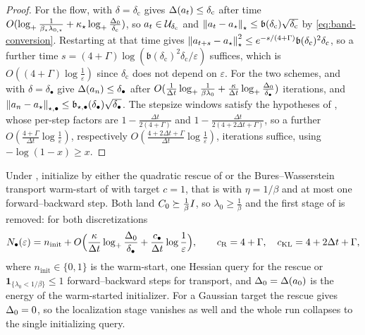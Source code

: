 \begin{proof}
For the flow,  with $\delta=\delta_{\mathrm c}$ gives
$\Delta(a_t)\leq\delta_{\mathrm c}$ after time
$O(\log_+\tfrac1{\beta_\star\lambda_{0,\star}}+\kappa_\star\log_+\tfrac{\Delta_0}{\delta_{\mathrm c}})$, so
$a_t\in\mathcal{U}_{\delta_{\mathrm c}}$ and
$\left\lVert a_t-a_\star\right\rVert_\star\leq\mathfrak b(\delta_{\mathrm c})\sqrt{\delta_{\mathrm c}}$ by
\eqref{eq:band-conversion}. Restarting  at that time gives
$\left\lVert a_{t+s}-a_\star\right\rVert_\star^2\leq e^{-s/(4+\Gamma)}\mathfrak b(\delta_{\mathrm c})^2\delta_{\mathrm c}$,
so a further time $s=(4+\Gamma)\log(\mathfrak b(\delta_{\mathrm c})^2\delta_{\mathrm c}/\varepsilon)$
suffices, which is $O((4+\Gamma)\log\tfrac1\varepsilon)$ since $\delta_{\mathrm c}$ does not
depend on $\varepsilon$. For the two schemes,  and  with
$\delta=\delta_\bullet$ give $\Delta(a_n)\leq\delta_\bullet$ after
$O(\tfrac1{\Delta t}\log_+\tfrac1{\beta\lambda_0}+\tfrac\kappa{\Delta t}\log_+\tfrac{\Delta_0}{\delta_\bullet})$
iterations, and $\left\lVert a_n-a_\star\right\rVert_{\star,\bullet}\leq\mathfrak b_{\star,\bullet}(\delta_\bullet)\sqrt{\delta_\bullet}$.
The stepsize windows satisfy the hypotheses of , whose per-step factors are
$1-\tfrac{\Delta t}{2(4+\Gamma)}$ and $1-\tfrac{\Delta t}{2(4+2\Delta t+\Gamma)}$, so a further
$O(\tfrac{4+\Gamma}{\Delta t}\log\tfrac1\varepsilon)$, respectively
$O(\tfrac{4+2\Delta t+\Gamma}{\Delta t}\log\tfrac1\varepsilon)$, iterations suffice, using
$-\log(1-x)\geq x$.
\end{proof}

\begin{corollary}
\label{cor:three-stage-burninfree}
Under , initialize by either the quadratic rescue of
 or the Bures--Wasserstein transport warm-start of  with
target $c=1$, that is with $\eta=1/\beta$ and at most one forward--backward step. Both land
$C_0\succeq\tfrac1\beta I$, so $\lambda_0\geq\tfrac1\beta$ and the first stage of
 is removed: for both discretizations
\[
    N_\bullet(\varepsilon)
    =n_{\mathrm{init}}
    +O\Bigl(\frac\kappa{\Delta t}\log_+\frac{\Delta_0}{\delta_\bullet}
    +\frac{c_\bullet}{\Delta t}\log\frac1\varepsilon\Bigr),
    \qquad
    c_{\mathrm{R}}=4+\Gamma,
    \quad
    c_{\mathrm{KL}}=4+2\Delta t+\Gamma,
\]
where $n_{\mathrm{init}}\in\{0,1\}$ is the warm-start, one Hessian query for the rescue or
$\mathbf 1_{\{\lambda_0<1/\beta\}}\leq1$ forward--backward steps for transport, and
$\Delta_0=\Delta(a_0)$ is the energy of the warm-started initializer. For a Gaussian target
the rescue gives $\Delta_0=0$, so the localization stage vanishes as well and the whole run
collapses to the single initializing query.
\end{corollary}

